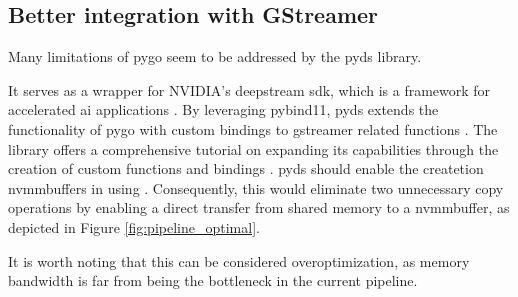 \subsection{Better integration with GStreamer}
Many limitations of \gls{pygo} seem to be addressed by the \gls{pyds} library.

It serves as a wrapper for NVIDIA's \gls{deepstream} \gls{sdk}, which is a framework for accelerated \gls{ai} applications \cite{nvidiaDeepStreamSDK2016}.
By leveraging \gls{pybind11}, \gls{pyds} extends the functionality of \gls{pygo} with custom bindings to \gls{gstreamer} related functions \cite{nvidiaaiiotReleasesNVIDIAAIIOTDeepstream}.
The library offers a comprehensive tutorial on expanding its capabilities through the creation of custom functions and bindings \cite[\textit{bindings/BINDINGSGUIDE.md}]{nvidiaaiiotReleasesNVIDIAAIIOTDeepstream}.
\gls{pyds} should enable the createtion \glspl{nvmmbuffer} in \py using  \cite{nvidiaNvBufSurfaceCreateDeepstreamDeepstream2023}\cite{babukrCreatingGstBuffersUsing2021}.
Consequently, this would eliminate two unnecessary copy operations by enabling a direct transfer from shared memory to a \gls{nvmmbuffer}, as depicted in Figure \ref{fig:pipeline_optimal}.

It is worth noting that this can be considered overoptimization, as memory bandwidth is far from being the bottleneck in the current pipeline.
